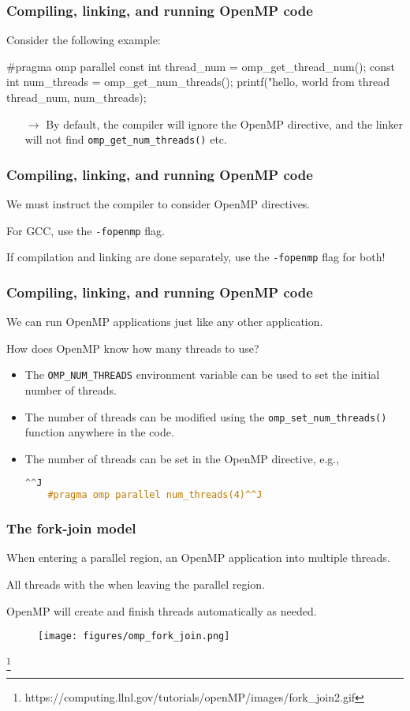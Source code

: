 \documentclass[12pt,t]{beamer}
\newcommand\blfootnote[1]{%
  \begingroup
  \renewcommand\thefootnote{}\footnote{\tiny #1}%
  \addtocounter{footnote}{-1}%
  \endgroup
}
\let\emph\relax %
\newcommand{\conclude}[1]{%
  \begin{itemize}
    \item[$\rightarrow$]#1
  \end{itemize}
}
\newcommand{\codeline}[2][]{%
  \begin{lstlisting}[language=c++,#1]^^J
    #2^^J
  \end{lstlisting}
}
\begin{document}
  \begin{frame}[fragile]
    \frametitle{Compiling, linking, and running OpenMP code}

    Consider the following example:
    \begin{code}
#pragma omp parallel
{
  const int thread_num = omp_get_thread_num();
  const int num_threads = omp_get_num_threads();
  printf("hello, world from thread %
         thread_num, num_threads);
}
    \end{code}

    \conclude{By default, the compiler will ignore the OpenMP directive, and the linker will not find \texttt{omp\_get\_num\_threads()} etc.}
  \end{frame}

  \begin{frame}[fragile]
    \frametitle{Compiling, linking, and running OpenMP code}

    We must instruct the compiler to consider OpenMP directives.

    For GCC, use the \texttt{-fopenmp} flag.

    If compilation and linking are done separately, use the \texttt{-fopenmp} flag for both!
  \end{frame}

  \begin{frame}[fragile]
    \frametitle{Compiling, linking, and running OpenMP code}

    We can run OpenMP applications just like any other application.

    How does OpenMP know how many threads to use?
    \begin{itemize}
      \item The \texttt{OMP\_NUM\_THREADS} environment variable can be used to set the initial number of threads.
      \item The number of threads can be modified using the \texttt{omp\_set\_num\_threads()} function anywhere in the code.
      \item The number of threads can be set in the OpenMP directive, e.g.,\codeline{#pragma omp parallel num_threads(4)}
    \end{itemize}
  \end{frame}

  \begin{frame}[fragile]
    \frametitle{The fork-join model}

    When entering a parallel region, an OpenMP application \emph{forks} into multiple threads.

    All threads \emph{join} with the \emph{master thread} when leaving the parallel region.

    OpenMP will create and finish threads automatically as needed.

    \begin{figure}
      \centering
      \texttt{[image: figures/omp\_fork\_join.png]}
    \end{figure}
    \blfootnote{https://computing.llnl.gov/tutorials/openMP/images/fork\_join2.gif}
  \end{frame}
\end{document}
